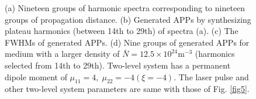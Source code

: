 \documentclass[10pt,letterpaper]{article}
\begin{document}
\begin{figure}[!htbp]
\centering
	\hspace{-0.3in}
	\hspace{-0.3in}
\caption{(a) Nineteen groups of harmonic spectra corresponding to nineteen groups of propagation distance. (b) Generated APPs by synthesizing plateau harmonics (between 14th to 29th) of spectra (a). (c) The FWHMs of generated APPs. (d) Nine groups of generated APPs for medium with a larger density of $\bar{N}=12.5\times10^{24} \textrm{m}^{-3}$ (harmonics selected from 14th to 29th). Two-level system has a permanent dipole moment of $\mu_{11}=4,\;\mu_{22}=-4(\xi=-4)$. The laser pulse and other two-level system parameters are same with those of Fig. \ref{fig5}.}
\label{fig6}
\end{figure}
\end{document}

